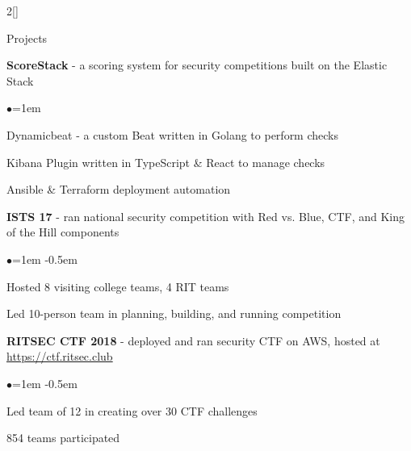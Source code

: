 \documentclass[8pt]{resume} %
\begin{document}
\begin{multicols}{2}[]


\begin{rSection}{Projects}
    
    {\bf ScoreStack} - a scoring system for security competitions built on the Elastic Stack
    \begin{list}{$\bullet$}{\leftmargin=1em}
        \item Dynamicbeat - a custom Beat written in Golang to perform checks
        \item Kibana Plugin written in TypeScript \& React to manage checks
        \item Ansible \& Terraform deployment automation
    \end{list}


    {\bf ISTS 17} - ran national security competition with Red vs. Blue, CTF,
        and King of the Hill components
    \begin{list}{$\bullet$}{\leftmargin=1em}
    \itemsep -0.5em \vspace{-0.5em}
        \item Hosted 8 visiting college teams, 4 RIT teams
        \item Led 10-person team in planning, building, and running competition
    \end{list}


    {\bf RITSEC CTF 2018} - deployed and ran security CTF on AWS, hosted at
    \url{https://ctf.ritsec.club}
    \begin{list}{$\bullet$}{\leftmargin=1em}
    \itemsep -0.5em \vspace{-0.5em}
        \item Led team of 12 in creating over 30 CTF challenges
        \item 854 teams participated
    \end{list}




\end{rSection}
\end{multicols}
\end{document}
